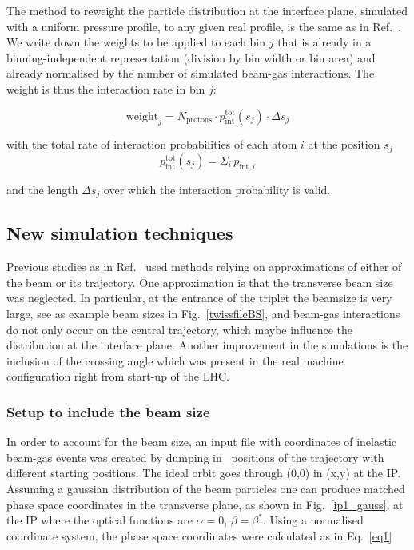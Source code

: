 The method to reweight the particle distribution at the interface plane, simulated with a uniform pressure profile, to any given real profile, is the same as in Ref.~\cite{nimPaperRod}. We write down the weights to be applied to each bin $j$ that is already in a binning-independent representation (division by bin width or bin area) and already normalised by the number of simulated beam-gas interactions. The weight is thus the interaction rate in bin $j$:

\begin{equation} \label{eq3}
\mathrm{weight}_j = N_{\mathrm{protons}} \cdot p_{\mathrm{int}}^{\mathrm{tot}} (s_j) \cdot \Delta s_{j} 
\end{equation}

with the total rate of interaction probabilities of each atom $i$ at the position $s_j$ 
\begin{equation*} 
  p_{\mathrm{int}}^{\mathrm{tot}} (s_j) = \Sigma_i \, p_{\textrm{int},i}
\end{equation*}

and the length $\Delta s_{j}$ over which the interaction probability is valid.

\subsection{New simulation techniques}
Previous studies as in Ref.~\cite{nimPaperRod} used methods relying on approximations of either of the beam or its trajectory. One approximation is that the transverse beam size was neglected. In particular, at the entrance of the triplet the beamsize is very large, see as example beam sizes in Fig.~\ref{twissfileBS}, and beam-gas interactions do not only occur on the central trajectory, which maybe influence the distribution at the interface plane. Another improvement in the simulations is the inclusion of the crossing angle which was present in the real machine configuration right from start-up of the LHC.

\subsubsection{Setup to include the beam size}

In order to account for the beam size, an input file with coordinates of inelastic beam-gas events was created by dumping in \fluka~positions of the trajectory with different starting positions. The ideal orbit goes through (0,0) in (x,y) at the IP. Assuming a gaussian distribution of the beam particles one can produce matched phase space coordinates in the transverse plane, as shown in Fig.~\ref{ip1_gauss}, at the IP where the optical functions are $\alpha=0$, $\beta=\beta^*$. Using a normalised coordinate system, the phase space coordinates were calculated as in Eq.~\ref{eq1}

